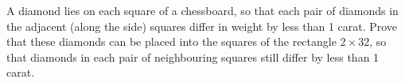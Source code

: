 \problem
A diamond lies on each square of a chessboard, so that each pair of diamonds
in the adjacent (along the side) squares differ in weight by less than 1 carat.
Prove that these diamonds can be placed into the squares of the rectangle
$2 \times 32$, so that diamonds in each pair of neighbouring squares still
differ by less than 1 carat.
\solution
\endproblem
